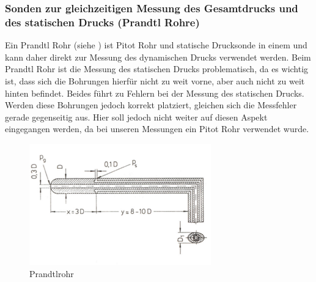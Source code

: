 \subsubsection{Sonden zur gleichzeitigen Messung des Gesamtdrucks und des statischen Drucks (Prandtl Rohre)}
Ein Prandtl Rohr (siehe ) ist Pitot Rohr und statische Drucksonde in einem und kann daher direkt zur Messung des dynamischen Drucks verwendet werden. Beim Prandtl Rohr ist die Messung des statischen Drucks problematisch, da es wichtig ist, dass sich die Bohrungen hierfür nicht zu weit vorne, aber auch nicht zu weit hinten befindet. Beides führt zu Fehlern bei der Messung des statischen Drucks. Werden diese Bohrungen jedoch korrekt platziert, gleichen sich die Messfehler gerade gegenseitig aus. Hier soll jedoch nicht weiter auf diesen Aspekt eingegangen werden, da bei unseren Messungen ein Pitot Rohr verwendet wurde.
\begin{figure}
	\centering
	\includegraphics[width=0.7\textwidth]{images/prandtl}
	\caption{Prandtlrohr}
	\label{prandtl}
\end{figure}